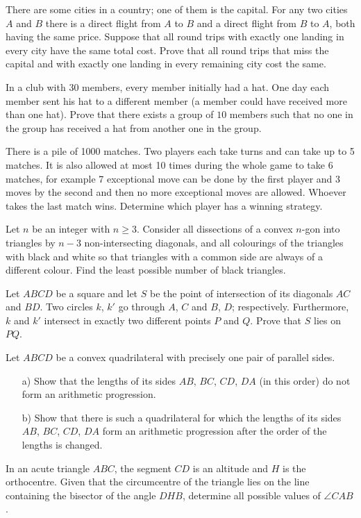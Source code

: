 \documentclass[11pt,a4paper]{amsart}
\theoremstyle{definition}
\begin{document}
\prob
There are some cities in a country; one of them is the capital.
For any two cities $A$ and $B$ there is a direct flight from $A$ to $B$ and a direct flight from $B$ to $A$, both having the same price.
Suppose that all round trips with exactly one landing in every city have the same total cost. Prove that all round trips that miss the capital and with exactly one landing in every remaining city cost the same.


\prob
In a club with $30$ members, every member initially had a hat.
One day each member sent his hat to a different member
(a member could have received more than one hat).
Prove that there exists a group of $10$ members such that
no one in  the group has received a hat from another
one in the group.


\prob
There is a pile of 1000 matches. Two players each take turns and can take up to 5 matches.
It is also allowed at most 10 times during the whole game to take 6 matches,
for example 7 exceptional move can be done by the first player and 3 moves by the second and then no more exceptional moves are allowed.
Whoever takes the last match wins.
Determine which player has a winning strategy.


\prob
Let $n$ be an integer with $n\geq 3$. 
Consider all dissections of a convex $n$-gon into triangles by 
$n-3$ non-intersecting diagonals, and all 
colourings of the triangles with black and white so that triangles with a 
common side are always of a different colour. Find the least possible number
of black triangles.

\prob
Let $ABCD$ be a square and let $S$ be the point of intersection of its diagonals $AC$ and $BD$. Two circles  $k$, $k'$ go through $A$, $C$ and $B$, $D$; respectively. Furthermore, $k$ and $k'$ intersect in exactly two different points $P$ and $Q$. Prove that $S$ lies on $PQ$.


\prob
Let $ABCD$ be a convex quadrilateral with precisely one pair of parallel sides.

\begin{itemize}
 \item[a)] Show that the lengths of its sides $AB$, $BC$, $CD$, $DA$ (in this order) do not form an arithmetic progression.
\item[b)] Show that there is such a quadrilateral for which 
the lengths of its sides $AB$, $BC$, $CD$, $DA$ form an arithmetic progression after the order of the lengths is changed. 
\end{itemize}


\prob
In an acute triangle $ABC$, the segment $CD$ is an altitude and $H$
is the orthocentre. Given that the circumcentre of the triangle lies
on the line containing the bisector of the angle $DHB$,
determine all possible values of $\angle CAB$.
\end{document}
